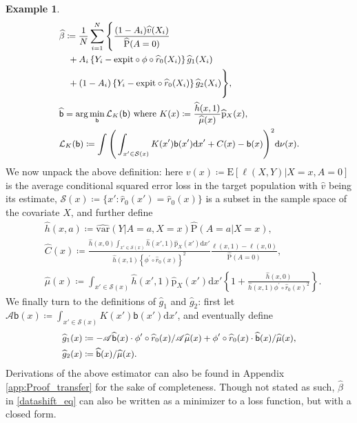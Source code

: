 \documentclass{article}
\def\sfb{\mathsf{b}}
\def\sfb{\mathsf{b}}
\def\var{\mathrm{var}}
\def\expit{\mathrm{expit}}
\theoremstyle{plain}
\theoremstyle{definition}
\newtheorem{example}[theorem]{Example}
\theoremstyle{remark}
\def\diff{\mathrm{d}}
\def\P{\mathrm{P}}
\def\E{\mathrm{E}}
\def\hat{\widehat}
\def\p{\mathrm{p}}
\begin{document}
\begin{example}
\begin{equation}
\small
\begin{split}
& \hat{\beta} \coloneqq \frac{1}{N} \sum_{i=1}^N \Bigg\{ \frac{(1 - A_i) \hat{v} (X_{i})}{\hat{\P} (A = 0)} \\
& \quad + A_i \left\{Y_i - \expit \circ \phi \circ \hat{r}_{0} (X_i) \right\} \hat{g}_1(X_i)\\
& \quad +(1-A_i)\left\{Y_i - \expit \circ \hat{r}_{0} (X_i)\right\} \hat{g}_2(X_i) \Bigg\},\\
& \hat{\sfb} = \arg\min_{\sfb} \mathcal{L}_{K} (\sfb)  \text{ where } K (x) \coloneqq \frac{\hat{h} (x, 1)}{\hat{\mu} (x)} \hat{\p}_{X} (x), \\
& \mathcal{L}_{K} (\sfb) \coloneqq \int \Bigg(
\int_{x' \in \mathcal{S}(x)} K (x') \sfb(x') \diff x' + C (x) - \sfb(x) \Bigg)^2 \diff \nu(x).
\end{split}
\label{datashift_eq}
\end{equation}
We now unpack the above definition: here $v (x) \coloneqq \E [\ell (X, Y) | X = x, A = 0]$ is the average conditional squared error loss in the target population with $\hat{v}$ being its estimate, $\mathcal{S}(x) \coloneqq \{x': \hat{r}_{0} (x') = \hat{r}_{0} (x)\}$ is a subset in the sample space of the covariate $X$, and further define
{\small\begin{align*}
& \hat{h}(x, a) \coloneqq\hat{\var} (Y | A=a, X=x) \hat{\P}(A=a | X=x), \\
& \hat{C}(x) \coloneqq\frac{\hat{h}(x , 0) \int_{x' \in \mathcal{S} (x)} \hat{h}(x', 1) \hat{\p}_{X} (x') \diff x'}{\hat{h}(x, 1)\left\{\phi^{\prime} \circ \hat{r}_{0}(x)\right\}^2} \frac{\ell(x, 1)-\ell(x, 0)}{\hat{\P}(A=0)} ,\\
& \hat{\mu}(x) \coloneqq\int_{x' \in \mathcal{S} (x)} \hat{h}(x', 1) \hat{\p}_{X} (x') \diff x' \left\{1+\frac{\hat{h}(x , 0)}{\hat{h}(x, 1) \phi^{\prime} \circ \hat{r}_{0}(x)^2}\right\}.
\end{align*}}
We finally turn to the definitions of $\hat{g}_{1}$ and $\hat{g}_{2}$: first let $\mathscr{A} \sfb (x) \coloneqq \int_{x' \in \mathcal{S}(x)} K (x') \mathsf{b}(x') \diff x'$, and eventually define
\begin{equation*}
\small
\begin{split}
& \hat{g}_1(x) \coloneqq -\mathscr{A} \hat{\sfb} (x) \cdot \phi^{\prime} \circ \hat{r}_{0} (x) / \mathscr{A} \hat{\mu}(x) + \phi^{\prime} \circ \hat{r}_{0} (x) \cdot \hat{\sfb} (x) / \hat{\mu}(x), \\
& \hat{g}_2(x) \coloneqq \hat{\sfb} (x) / \hat{\mu}(x).
\end{split}
\end{equation*}
Derivations of the above estimator can also be found in Appendix \ref{app:Proof_transfer} for the sake of completeness. Though not stated as such, $\hat{\beta}$ in \eqref{datashift_eq} can also be written as a minimizer to a loss function, but with a closed form.


\end{example}
\end{document}
